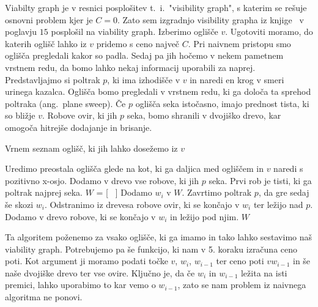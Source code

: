 \documentclass{article}
\begin{document}
Viabilty graph je v resnici posplošitev t.~i.\ "visibility graph", s katerim se rešuje osnovni problem kjer je $C = 0$. Zato sem izgradnjo visibility grapha iz knjige~\cite{BCKO} v poglavju $15$ posplošil na viability graph. Izberimo oglišče $v$. Ugotoviti moramo, do katerih oglišč lahko iz $v$ pridemo s ceno največ $C$. Pri naivnem pristopu smo oglišča pregledali kakor so padla. Sedaj pa jih hočemo v nekem pametnem vrstnem redu, da bomo lahko nekaj informacij uporabili za naprej. Predstavljajmo si poltrak $p$, ki ima izhodišče v $v$ in naredi en krog v smeri urinega kazalca. Oglišča bomo pregledali v vrstnem redu, ki ga določa ta sprehod poltraka (ang.\ plane sweep). Če $p$ oglišča seka istočasno, imajo prednost tista, ki so bližje $v$.
Robove ovir, ki jih $p$ seka, bomo shranili v dvojiško drevo, kar omogoča hitrejše dodajanje in brisanje.

\begin{algorithm}
    \caption{Vrnem seznam oglišč, ki jih lahko dosežemo iz $v$}
    \begin{algorithmic}[1]
        \State Uredimo preostala oglišča glede na kot, ki ga daljica med ogliščem in $v$ naredi s pozitivno x-osjo.
        \State  Dodamo v drevo vse robove, ki jih $p$ seka. Prvi rob je tisti, ki ga poltrak najprej seka.
        \State $W$ = [ \ ]
            \State Dodamo $w_i$ v $W$.
        \EndIf
        \State Zavrtimo poltrak $p$, da gre sedaj še skozi $w_i$.
        \State Odstranimo iz drevesa robove ovir, ki se končajo v $w_i$ ter ležijo nad $p$.
        \State Dodamo v drevo robove, ki se končajo v $w_i$ in ležijo pod njim.
        \EndFor
        \State \Return $W$
    \end{algorithmic}
\end{algorithm}

Ta algoritem poženemo za vsako oglišče, ki ga imamo in tako lahko sestavimo naš viability graph. Potrebujemo pa še funkcijo, ki nam v 5. koraku izračuna ceno poti. Kot argument ji moramo podati točke $v$, $w_i$, $w_{i-1}$ ter ceno poti $vw_{i-1}$ in še naše dvojiške drevo ter vse ovire. Ključno je, da če $w_i$ in $w_{i-1}$ ležita na isti premici, lahko uporabimo to kar vemo o $w_{i-1}$, zato se nam problem iz naivnega algoritma ne ponovi. 
\end{document}
